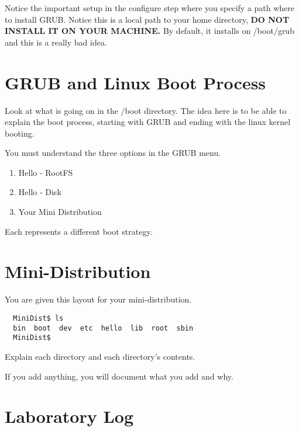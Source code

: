 \documentclass[10]{article}
\begin{document}
Notice the important setup in the configure step
where you specify a path where to install GRUB.
Notice this is a local path to your home directory,
{\bf DO NOT INSTALL IT ON YOUR MACHINE.}
By default, it installs on /boot/grub
and this is a really bad idea.

\section{GRUB and Linux Boot Process}

Look at what is going on in the /boot directory.
The idea here is to be able to explain the boot process,
starting with GRUB and ending with the linux kernel booting.

You must understand the three options in the GRUB menu.

\begin{enumerate}
\item
Hello - RootFS
\item
Hello - Disk
\item
Your Mini Distribution
\end{enumerate}

Each represents a different boot strategy.

\section{Mini-Distribution}

You are given this layout for your mini-distribution.
{\em\small 
\begin{verbatim}
  MiniDist$ ls
  bin  boot  dev  etc  hello  lib  root  sbin
  MiniDist$
\end{verbatim}
}

Explain each directory and each directory's contents.

If you add anything, you will document what you add and why.

\section{Laboratory Log}
\end{document}

